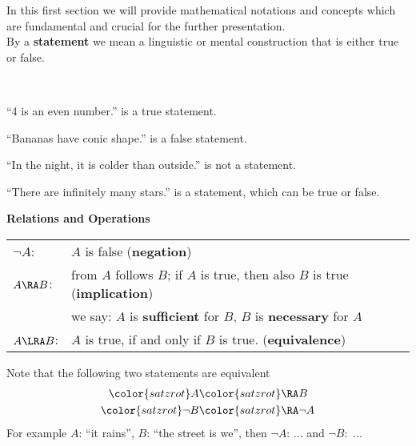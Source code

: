 
\begin{frame}
	In this first section we will provide mathematical notations and concepts which are fundamental and crucial for the further presentation.\\
	\vspace{0.2cm}
		\vspace{0.2cm}
	By a \textbf{statement} we mean a linguistic or mental construction that is either true or false.
	\vspace{0.2cm}
	\begin{ex}~\\\vspace{0.1cm}
		\ite
		\item ``4 is an even number.'' is a true statement.
		\item ``Bananas have conic shape.'' is a false statement.
		\item ``In the night, it is colder than outside.'' is not a statement.
		\item ``There are infinitely many stars.'' is a statement, which can be true or false.
		\eti
	\end{ex}
	\vspace{0.2cm}
	\textbf{Relations and Operations}
	\color{defgruen}
	\begin{center} \vspace{-0.1cm}
		\begin{tabular}[t]{ll}
			$\neg A$: & $A$ is false (\textbf{negation})\\\vspace{0.2cm}
			$A\RA B$: & from $A$ follows $B$; if $A$ is true, then also $B$ is true (\textbf{implication})\\\vspace{0.2cm}
			& we say: $A$ is \textbf{sufficient} for $B$, $B$ is \textbf{necessary} for $A$\\\vspace{0.2cm}
			$A\LRA B$: & $A$ is true, if and only if  $B$ is true. (\textbf{equivalence})
		\end{tabular}
	\end{center}
\color{fontcolor}
	Note that the following two statements are equivalent
	\begin{align*}
	\color{satzrot}A&\color{satzrot}\RA B\\
	\color{satzrot}\neg B&\color{satzrot} \RA \neg A 
	\end{align*}
	{
\blank
For example $A$: ``it rains'', $B$: ``the street is we'', then $\neg A$: ... and $\neg B:$ ...	
}
\end{frame}

